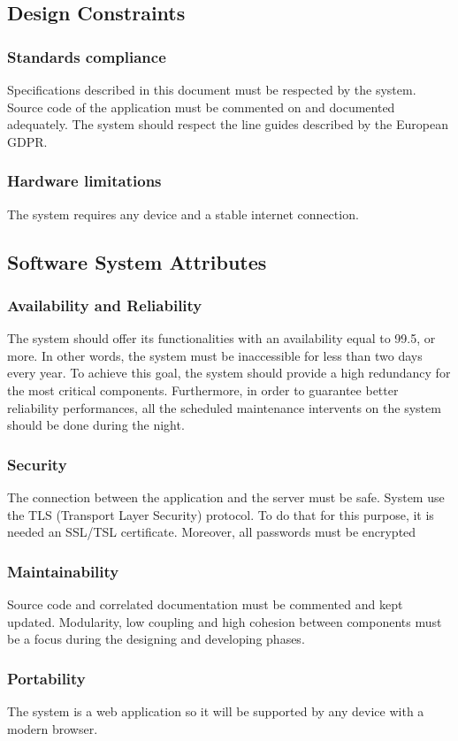 \subsection{Design Constraints}


\subsubsection{Standards compliance}
Specifications described in this document must be respected by the system.
Source code of the application must be commented on and documented adequately.
The system should respect the line guides described by the European GDPR.

\subsubsection{Hardware limitations}
The system requires any device and a stable internet connection.

\subsection{Software System Attributes}

\subsubsection{Availability and Reliability}
The system should offer its functionalities with an availability
equal to 99.5, or more. In other words, the system must be inaccessible
for less than two days every year. To achieve this goal, the system should
provide a high redundancy for the most critical components.
Furthermore, in order to guarantee better reliability performances, all
the scheduled maintenance intervents on the system should be done during
the night.

\subsubsection{Security}
The connection between the application and the server must be safe.
System use the TLS (Transport Layer Security) protocol.
To do that for this purpose, it is needed an SSL/TSL certificate.
Moreover, all passwords must be encrypted

\subsubsection{Maintainability}
Source code and correlated documentation must be commented and kept updated.
Modularity, low coupling and high cohesion between components must be a focus during the
designing and developing phases.

\subsubsection{Portability}
The system is a web application so it will be supported by any device with
a modern browser.